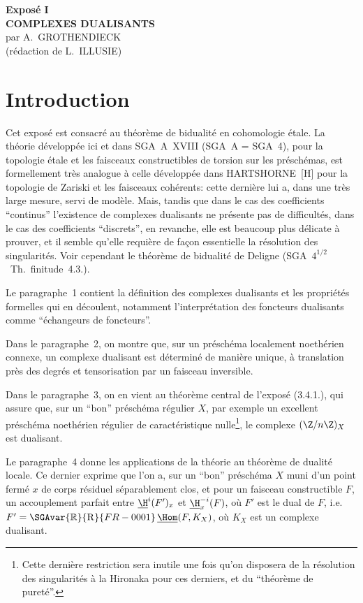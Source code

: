 \begin{center}
{\Large \textbf{Exposé I}}\\[0.4em]
{\large \textbf{COMPLEXES DUALISANTS}}\\[0.3em]
par A.~GROTHENDIECK\\
(rédaction de L.~ILLUSIE)
\end{center}

\section*{Introduction}

Cet exposé est consacré au théorème de bidualité en cohomologie étale. La théorie développée ici et dans SGA~A~XVIII (SGA~A = SGA~4), pour la topologie étale et les faisceaux constructibles de torsion sur les préschémas, est formellement très analogue à celle développée dans HARTSHORNE~[H] pour la topologie de Zariski et les faisceaux cohérents: cette dernière lui a, dans une très large mesure, servi de modèle. Mais, tandis que dans le cas des coefficients ``continus'' l'existence de complexes dualisants ne présente pas de difficultés, dans le cas des coefficients ``discrets'', en revanche, elle est beaucoup plus délicate à prouver, et il semble qu'elle requière de façon essentielle la résolution des singularités. Voir cependant le théorème de bidualité de Deligne (SGA~$4^{1/2}$~Th.~finitude~4.3.).

Le paragraphe~1 contient la définition des complexes dualisants et les propriétés formelles qui en découlent, notamment l'interprétation des foncteurs dualisants comme ``échangeurs de foncteurs''.

Dans le paragraphe~2, on montre que, sur un préschéma localement noethérien connexe, un complexe dualisant est déterminé de manière unique, à translation près des degrés et tensorisation par un faisceau inversible.

Dans le paragraphe~3, on en vient au théorème central de l'exposé (3.4.1.), qui assure que, sur un ``bon'' préschéma régulier $X$, par exemple un excellent préschéma noethérien régulier de caractéristique nulle\footnote{Cette dernière restriction sera inutile une fois qu'on disposera de la résolution des singularités à la Hironaka pour ces derniers, et du ``théorème de pureté''.}, le complexe $(\Z/n\Z)_X$ est dualisant.

Le paragraphe~4 donne les applications de la théorie au théorème de dualité locale. Ce dernier exprime que l'on a, sur un ``bon'' préschéma $X$ muni d'un point fermé $x$ de corps résiduel séparablement clos, et pour un faisceau constructible $F$, un accouplement parfait entre $\underline{\H}^i(F')_x$ et $\underline{\H}^{-i}_x(F)$, où $F'$ est le dual de $F$, i.e.\ $F' = \SGAvar{\mathbb{R}}{\mathrm{R}}{FR-0001}\,\underline{\Hom}(F,K_X)$, où $K_X$ est un complexe dualisant.

